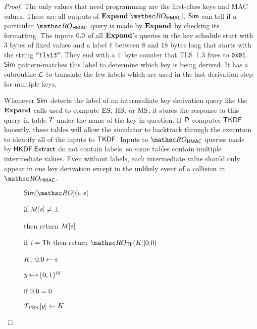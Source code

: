 \begin{proof}
	The only values that need programming are the first-class keys and MAC values.
	These are all outputs of $\abstractExpand[\ROhmac]$. 
	$\mathsf{Sim}$ can tell if a particular $\ROhmac$ query is made by $\mathbf{Expand}$ by checking its formatting.
	The inputs $\hmactext$ of all $\mathbf{Expand}$'s queries in the key schedule start with $3$ bytes of fixed values and a label $\ell$ between $8$ and $18$ bytes long that starts with the string \texttt{``tls13''}. They end with a $1$~byte counter that TLS~1.3 fixes to \texttt{0x01}.
	$\mathsf{Sim}$ pattern-matches this label to determine which key is being derived. 
	It has a subroutine $\mathcal{L}$ to translate the few labels which are used in the last derivation step for multiple keys.	
	
	Whenever $\mathsf{Sim}$ detects the label of an intermediate key derivation query like the $\mathbf{Expand}$ calls used to compute $\mathrm{ES}$, $\mathrm{HS}$, or $\mathrm{MS}$, it stores the response to this query in table $T$ under the name of the key in question.
	If $\mathcal{D}$ computes $\mathsf{TKDF}$ honestly, these tables will allow the simulator to backtrack through the execution to identify all of the inputs to $\mathsf{TKDF}$. 
	Inputs to $\ROhmac$ queries made by $\mathsf{HKDF.Extract}$ do not contain labels, so some tables contain multiple intermediate values.
	Even without labels, each intermediate value should only appear in one key derivation except in the unlikely event of a collision in $\ROhmac$.  
	
	\begin{figure}[tp]
		\begin{minipage}[t]{0.45\textwidth}
			\NewExperiment[$\Sim(\simIndex,\simInString)$]
			
			\begin{oracle}{$\Sim[\RO](\simIndex,\simInString)$}
				\item if $M[s] \neq \bot$
				\item \quad then return $M[s]$
				\item if $i=\mathsf{Th}$ then return $\ROthash(K \| \Y)$
				\item[] 
				\item $K$, $\hmactext \gets \simInString$
				\item[] 
				\item $\simOut \getsr \bits^{\hashlen}$
				
				\item if $\hmactext = 0$ 
				\item \quad $T_{\mathrm{PSK}}[y] \gets K$
				

\end{oracle}
\end{minipage}
\end{figure}
\end{proof}
